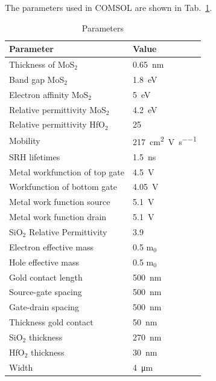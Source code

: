 \documentclass[12pt,a4paper,titlepage]{article}
\begin{document}
The parameters used in COMSOL are shown in Tab.~\ref{table:HfO2}.
\begin{table}[H]
	\centering
	\begin{tabular}{l l}
		\toprule
		\textbf{Parameter}             & \textbf{Value}       \\
		\midrule 
		Thickness of MoS$_2$           & \SI{0.65}{\nano \meter}              \\ 
		Band gap MoS$_2$               & \SI{1.8}{\electronvolt}               \\ 
		Electron affinity MoS$_2$      & \SI{5}{\electronvolt}               \\ 
		Relative permittivity MoS$_2$  & \SI{4.2}{\electronvolt}               \\ 
		Relative permittivity HfO$_2$  & 25                   \\ 
		Mobility                       & \SI{217}{\square \centi \meter  \per \volt \per \second} \\ 
		SRH lifetimes                  & \SI{1.5}{\nano \second}           \\ 
		Metal workfunction of top gate & \SI{4.5}{\volt}                \\ 
		Workfunction of bottom gate    & \SI{4.05}{\volt}               \\ 
		Metal work function source     & \SI{5.1}{\volt}                \\ 
		Metal work function drain      & \SI{5.1}{\volt}                \\ 
		SiO$_2$ Relative Permittivity  & 3.9                  \\ 
		Electron effective mass        & 0.5 m$_0$            \\ 
		Hole effective mass            & 0.5 m$_0$            \\ 
		Gold contact length            & \SI{500}{\nano \meter}               \\ 
		Source-gate spacing            & \SI{500}{\nano \meter}                \\ 
		Gate-drain spacing             & \SI{500}{\nano \meter}                \\ 
		Thickness gold contact         & \SI{50}{\nano \meter}                 \\ 
		SiO$_2$ thickness              & \SI{270}{\nano \meter}                \\ 
		HfO$_2$ thickness              & \SI{30}{\nano \meter}                \\ 
		Width                          & \SI{4}{\micro \meter}               \\
		\bottomrule
	\end{tabular}
	\caption{Parameters}
	\label{table:HfO2}
\end{table}
\end{document}
